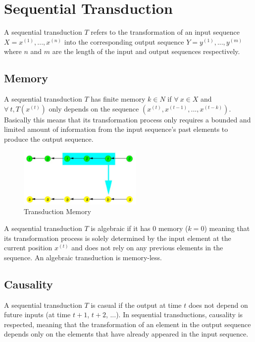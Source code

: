 \newpage
\section{Sequential Transduction}

A sequential transduction $T$ refers to the transformation of an input sequence $X = x^{(1)}, ..., x^{(n)}$ into the corresponding output sequence $Y=y^{(1)}, ..., y^{(m)}$ where $n$ and $m$ are the length of the input and output sequences respectively.

\subsection{Memory}

A sequential transduction $T$ has finite memory $k \in N$ if $ \forall ~ x \in X$ and $\forall ~ t, T(x^{(t)})$ only depends on the sequence $ \left ( x^{(t)}, x^{(t-1)}, ..., x^{(t-k)}  \right ) $. Basically this means that its transformation process only requires a bounded and limited amount of information from the input sequence's past elements to produce the output sequence.

\begin{figure}[h]
    \centering
    \includegraphics[width=6cm]{Images/transduction-memory.jpg}
    \caption{Transduction Memory}
    \label{fig:transduction-memory}
\end{figure}

\noindent A sequential transduction $T$ is algebraic if it has 0 memory ($k=0$) meaning that its transformation process is solely determined by the input element at the current position $x^{(t)}$ and does not rely on any previous elements in the sequence. An algebraic transduction is memory-less.

\subsection{Causality}

A sequential transduction $T$ is casual if the output at time $t$ does not depend on future inputs (at time $t+1$, $t+2$, ...). In sequential transductions, causality is respected, meaning that the transformation of an element in the output sequence depends only on the elements that have already appeared in the input sequence.

